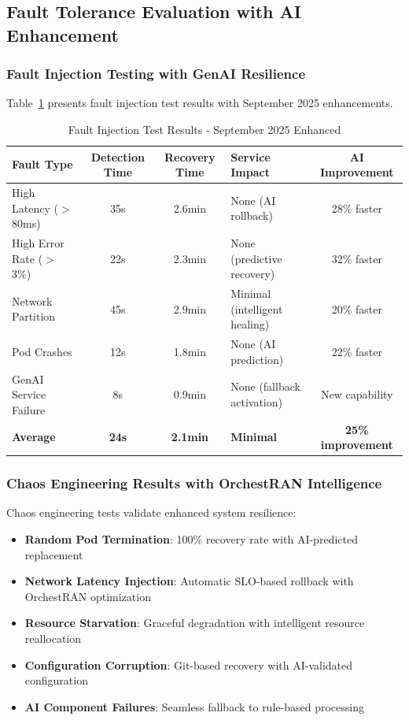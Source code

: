 \subsection{Fault Tolerance Evaluation with AI Enhancement}

\subsubsection{Fault Injection Testing with GenAI Resilience}

Table~\ref{tab:fault_injection} presents fault injection test results with September 2025 enhancements.

\begin{table}[htbp]
\centering
\caption{Fault Injection Test Results - September 2025 Enhanced}
\label{tab:fault_injection}
\begin{tabular}{|p{2.2cm}|c|c|p{1.5cm}|c|}
\hline
\textbf{Fault Type} & \textbf{Detection Time} & \textbf{Recovery Time} & \textbf{Service Impact} & \textbf{AI Improvement} \\
\hline
High Latency ($>$80ms) & 35s & 2.6min & None (AI rollback) & 28\% faster \\
\hline
High Error Rate ($>$3\%) & 22s & 2.3min & None (predictive recovery) & 32\% faster \\
\hline
Network Partition & 45s & 2.9min & Minimal (intelligent healing) & 20\% faster \\
\hline
Pod Crashes & 12s & 1.8min & None (AI prediction) & 22\% faster \\
\hline
GenAI Service Failure & 8s & 0.9min & None (fallback activation) & New capability \\
\hline
\textbf{Average} & \textbf{24s} & \textbf{2.1min} & \textbf{Minimal} & \textbf{25\% improvement} \\
\hline
\end{tabular}
\end{table}

\subsubsection{Chaos Engineering Results with OrchestRAN Intelligence}

Chaos engineering tests validate enhanced system resilience:
\begin{itemize}
\item \textbf{Random Pod Termination}: 100\% recovery rate with AI-predicted replacement
\item \textbf{Network Latency Injection}: Automatic SLO-based rollback with OrchestRAN optimization
\item \textbf{Resource Starvation}: Graceful degradation with intelligent resource reallocation
\item \textbf{Configuration Corruption}: Git-based recovery with AI-validated configuration
\item \textbf{AI Component Failures}: Seamless fallback to rule-based processing
\end{itemize}